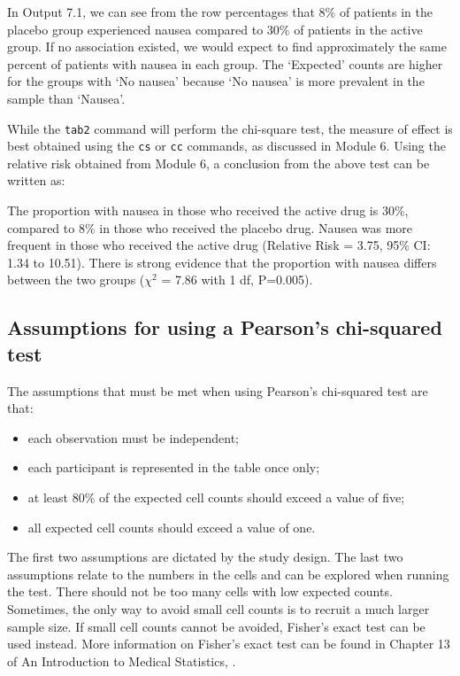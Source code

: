 \documentclass[
]{memoir}
\providecommand{\tightlist}{%
  \setlength{\itemsep}{0pt}\setlength{\parskip}{0pt}}
\begin{document}
In Output 7.1, we can see from the row percentages that 8\% of patients in the placebo group experienced nausea compared to 30\% of patients in the active group. If no association existed, we would expect to find approximately the same percent of patients with nausea in each group. The `Expected' counts are higher for the groups with `No nausea' because `No nausea' is more prevalent in the sample than `Nausea'.

While the \texttt{tab2} command will perform the chi-square test, the measure of effect is best obtained using the \texttt{cs} or \texttt{cc} commands, as discussed in Module 6. Using the relative risk obtained from Module 6, a conclusion from the above test can be written as:

The proportion with nausea in those who received the active drug is 30\%, compared to 8\% in those who received the placebo drug. Nausea was more frequent in those who received the active drug (Relative Risk = 3.75, 95\% CI: 1.34 to 10.51). There is strong evidence that the proportion with nausea differs between the two groups (\(\chi ^2\) = 7.86 with 1 df, P=0.005).

\hypertarget{assumptions-for-using-a-pearsons-chi-squared-test}{%
\subsection{Assumptions for using a Pearson's chi-squared test}\label{assumptions-for-using-a-pearsons-chi-squared-test}}

The assumptions that must be met when using Pearson's chi-squared test are that:

\begin{itemize}
\tightlist
\item
  each observation must be independent;
\item
  each participant is represented in the table once only;
\item
  at least 80\% of the expected cell counts should exceed a value of five;
\item
  all expected cell counts should exceed a value of one.
\end{itemize}

The first two assumptions are dictated by the study design. The last two assumptions relate to the numbers in the cells and can be explored when running the test. There should not be too many cells with low expected counts. Sometimes, the only way to avoid small cell counts is to recruit a much larger sample size. If small cell counts cannot be avoided, Fisher's exact test can be used instead. More information on Fisher's exact test can be found in Chapter 13 of An Introduction to Medical Statistics, \citet{bland15}.
\end{document}
